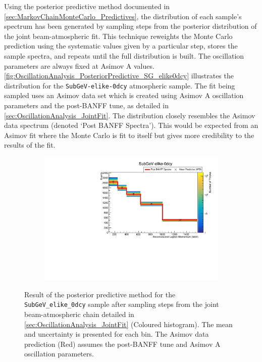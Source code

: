 Using the posterior predictive method documented in \autoref{sec:MarkovChainMonteCarlo_Predictives}, the distribution of each sample's spectrum has been generated by sampling  steps from the posterior distribution of the joint beam-atmospheric fit. This technique reweights the Monte Carlo prediction using the systematic values given by a particular step, stores the sample spectra, and repeats until the full distribution is built. The oscillation parameters are always fixed at Asimov A values. \autoref{fig:OscillationAnalysis_PosteriorPredictive_SG_elike0dcy} illustrates the distribution for the \texttt{SubGeV-elike-0dcy} atmospheric sample. The fit being sampled uses an Asimov data set which is created using Asimov A oscillation parameters and the post-BANFF tune, as detailed in \autoref{sec:OscillationAnalysis_JointFit}. The distribution closely resembles the Asimov data spectrum (denoted `Post BANFF Spectra'). This would be expected from an Asimov fit where the Monte Carlo is fit to itself but gives more credibility to the results of the fit.

\begin{figure}[h]
  \begin{subfigure}[t]{0.98\textwidth}
    \includegraphics[width=\textwidth, trim={0mm 0mm 0mm 0mm}, clip,page=1]{Figures/OA/Predictive_AllSyst.pdf}
  \end{subfigure}
  \caption{Result of the posterior predictive method for the \texttt{SubGeV\_elike\_0dcy} sample after sampling  steps from the joint beam-atmospheric chain detailed in \autoref{sec:OscillationAnalysis_JointFit} (Coloured histogram). The mean and uncertainty is presented for each bin. The Asimov data prediction (Red) assumes the post-BANFF tune and Asimov A oscillation parameters.}
  \label{fig:OscillationAnalysis_PosteriorPredictive_SG_elike0dcy}
\end{figure}

